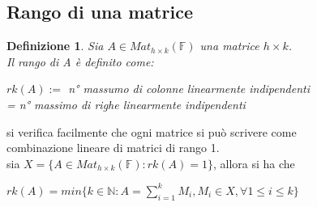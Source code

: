 \documentclass[a4paper,12pt]{article}
\theoremstyle{def}
\newtheorem*{definition}{Definizione}
\theoremstyle{prop}
\theoremstyle{esempio}
\theoremstyle{dimostrazione}
\theoremstyle{teo}
\theoremstyle{osservazione}
\begin{document}
\subsection{Rango di una matrice}
\begin{definition}
	Sia \(A \in Mat_{h \times k}(\mathbb{F})\) una matrice \(h \times k\).\\
	Il rango di A è definito come:
	\begin{center}
		\(rk(A):=\) n° massumo di colonne linearmente indipendenti\\
		= n° massimo di righe linearmente indipendenti
	\end{center}
\end{definition}
si verifica facilmente che ogni matrice si può scrivere come\\
combinazione lineare di matrici di rango 1.\\
sia \(X = \{A \in Mat_{h \times k}(\mathbb{F}) : rk(A) = 1\}\), allora si ha che
\begin{center}
	\(rk(A) = min\{k \in \mathbb{N} : A = \sum_{i = 1}^{k} M_i , M_i \in X, \forall 1 \leq i \leq k\}\)
\end{center}
\end{document}
